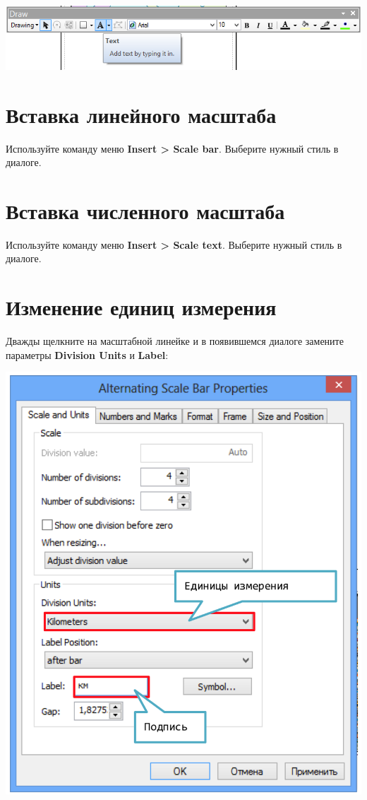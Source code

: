 \documentclass[]{book}
\theoremstyle{definition}
\theoremstyle{definition}
\theoremstyle{definition}
\theoremstyle{remark}
\begin{document}
\includegraphics{images/Appendix/image55.png}

\hypertarget{--}{%
\section{Вставка линейного масштаба}\label{--}}

Используйте команду меню \textbf{Insert \textgreater{} Scale bar}.
Выберите нужный стиль в диалоге.

\hypertarget{--}{%
\section{Вставка численного масштаба}\label{--}}

Используйте команду меню \textbf{Insert \textgreater{} Scale text}.
Выберите нужный стиль в диалоге.

\hypertarget{--}{%
\section{Изменение единиц измерения}\label{--}}

Дважды щелкните на масштабной линейке и в появившемся диалоге замените
параметры \textbf{Division Units} и \textbf{Label}:

\includegraphics{images/Appendix/image56.png}
\end{document}
